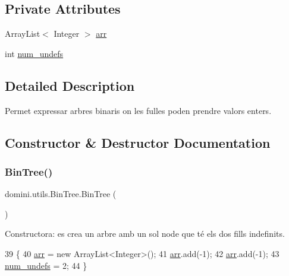 \subsection*{Private Attributes}
\begin{DoxyCompactItemize}
\item 
Array\+List$<$ Integer $>$ \hyperlink{classdomini_1_1utils_1_1BinTree_a357bcbcf07ba7fcb99d11b237d189e65}{arr}
\item 
int \hyperlink{classdomini_1_1utils_1_1BinTree_a36f1212262c353accbc0a0385fa45a8d}{num\+\_\+undefs}
\end{DoxyCompactItemize}


\subsection{Detailed Description}
Permet expressar arbres binaris on les fulles poden prendre valors enters. 

\subsection{Constructor \& Destructor Documentation}
\mbox{\label{classdomini_1_1utils_1_1BinTree_a46082da82a1186c5a99ae68eee6ece13}} 
\subsubsection{\texorpdfstring{Bin\+Tree()}{BinTree()}\hspace{0.1cm}{\footnotesize\ttfamily [1/3]}}
{\footnotesize\ttfamily domini.\+utils.\+Bin\+Tree.\+Bin\+Tree (\begin{DoxyParamCaption}{ }\end{DoxyParamCaption})\hspace{0.3cm}{\ttfamily [inline]}}



Constructora\+: es crea un arbre amb un sol node que té els dos fills indefinits. 


\begin{DoxyCode}
39                      \{
40         \hyperlink{classdomini_1_1utils_1_1BinTree_a357bcbcf07ba7fcb99d11b237d189e65}{arr} = \textcolor{keyword}{new} ArrayList<Integer>();
41         \hyperlink{classdomini_1_1utils_1_1BinTree_a357bcbcf07ba7fcb99d11b237d189e65}{arr}.add(-1);
42         \hyperlink{classdomini_1_1utils_1_1BinTree_a357bcbcf07ba7fcb99d11b237d189e65}{arr}.add(-1);
43         \hyperlink{classdomini_1_1utils_1_1BinTree_a36f1212262c353accbc0a0385fa45a8d}{num\_undefs} = 2;
44     \}
\end{DoxyCode}
\mbox{\label{classdomini_1_1utils_1_1BinTree_a83904c6ebf931ba29a134be5f29a66c7}} 
